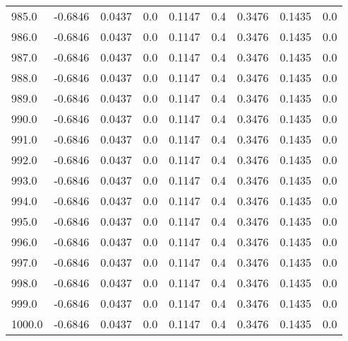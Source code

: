 \begin{longtable}{lrrrrrrrr}
985.0 & -0.6846 & 0.0437 & 0.0 & 0.1147 & 0.4 & 0.3476 & 0.1435 & 0.0 \\
986.0 & -0.6846 & 0.0437 & 0.0 & 0.1147 & 0.4 & 0.3476 & 0.1435 & 0.0 \\
987.0 & -0.6846 & 0.0437 & 0.0 & 0.1147 & 0.4 & 0.3476 & 0.1435 & 0.0 \\
988.0 & -0.6846 & 0.0437 & 0.0 & 0.1147 & 0.4 & 0.3476 & 0.1435 & 0.0 \\
989.0 & -0.6846 & 0.0437 & 0.0 & 0.1147 & 0.4 & 0.3476 & 0.1435 & 0.0 \\
990.0 & -0.6846 & 0.0437 & 0.0 & 0.1147 & 0.4 & 0.3476 & 0.1435 & 0.0 \\
991.0 & -0.6846 & 0.0437 & 0.0 & 0.1147 & 0.4 & 0.3476 & 0.1435 & 0.0 \\
992.0 & -0.6846 & 0.0437 & 0.0 & 0.1147 & 0.4 & 0.3476 & 0.1435 & 0.0 \\
993.0 & -0.6846 & 0.0437 & 0.0 & 0.1147 & 0.4 & 0.3476 & 0.1435 & 0.0 \\
994.0 & -0.6846 & 0.0437 & 0.0 & 0.1147 & 0.4 & 0.3476 & 0.1435 & 0.0 \\
995.0 & -0.6846 & 0.0437 & 0.0 & 0.1147 & 0.4 & 0.3476 & 0.1435 & 0.0 \\
996.0 & -0.6846 & 0.0437 & 0.0 & 0.1147 & 0.4 & 0.3476 & 0.1435 & 0.0 \\
997.0 & -0.6846 & 0.0437 & 0.0 & 0.1147 & 0.4 & 0.3476 & 0.1435 & 0.0 \\
998.0 & -0.6846 & 0.0437 & 0.0 & 0.1147 & 0.4 & 0.3476 & 0.1435 & 0.0 \\
999.0 & -0.6846 & 0.0437 & 0.0 & 0.1147 & 0.4 & 0.3476 & 0.1435 & 0.0 \\
1000.0 & -0.6846 & 0.0437 & 0.0 & 0.1147 & 0.4 & 0.3476 & 0.1435 & 0.0 \\
\end{longtable}